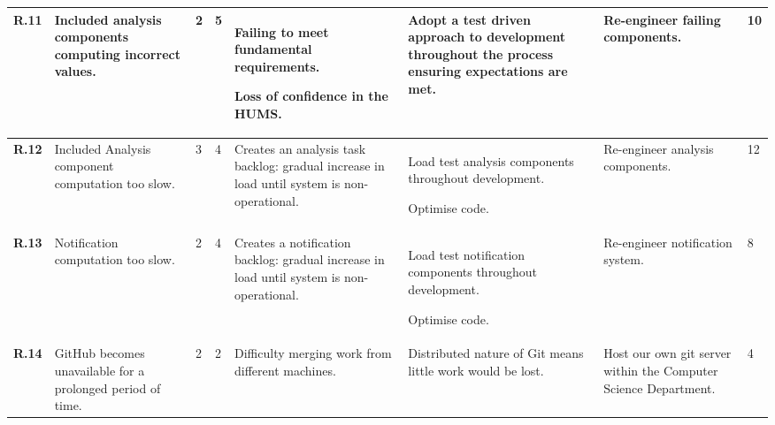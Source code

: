 \begin{longtable}[H]{| p{0.65cm} | p{2cm} | p{0.3cm} | p{0.3cm} | p{2.7cm} | p{3cm} | p{2.6cm} | p{0.4cm} |}
  \hline \textbf{R.11}
  & Included analysis components computing incorrect values.
  & 2
  & 5
  & Failing to meet fundamental requirements.
  
  Loss of confidence in the HUMS.
  & Adopt a test driven approach to development throughout the process
  ensuring expectations are met.
  & Re-engineer failing components.
  & 10\\
  
  \hline \textbf{R.12}
  & Included Analysis component computation too slow.
  & 3
  & 4
  & Creates an analysis task backlog: gradual increase in load until system
  is non-operational.
  & Load test analysis components throughout development.
  
    Optimise code.
  & Re-engineer analysis components.
  & 12\\  
  
  \hline \textbf{R.13}
  & Notification computation too slow.
  & 2
  & 4
  & Creates a notification backlog: gradual increase in load until system
  is non-operational.
  & Load test notification components throughout development.
 
  Optimise code.
  & Re-engineer notification system.
  & 8\\
  
  \hline \textbf{R.14}
  & GitHub becomes unavailable for a prolonged period of time.
  & 2
  & 2
  & Difficulty merging work from different machines.
  & Distributed nature of Git means little work would be lost.
  & Host our own git server within the Computer Science Department.
  & 4\\ 
    \hline
\end{longtable}       

